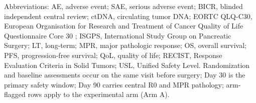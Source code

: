 \vspace{-0.5em}

\noindent Abbreviations: AE, adverse event; SAE, serious adverse event; BICR,
blinded independent central review; ctDNA, circulating tumor DNA; EORTC QLQ-C30,
European Organisation for Research and Treatment of Cancer Quality of Life
Questionnaire Core 30 \cite{EORTCqlqc30}; ISGPS, International Study Group on
Pancreatic Surgery; LT, long-term; MPR, major pathologic response; OS, overall
survival; PFS, progression-free survival; QoL, quality of life; RECIST, Response
Evaluation Criteria in Solid Tumors; USL, Unified Safety Level. Randomization and
baseline assessments occur on the same visit before surgery; Day 30 is the primary
safety window; Day 90 carries central R0 and MPR pathology; arm-flagged rows apply
to the experimental arm (Arm A).
